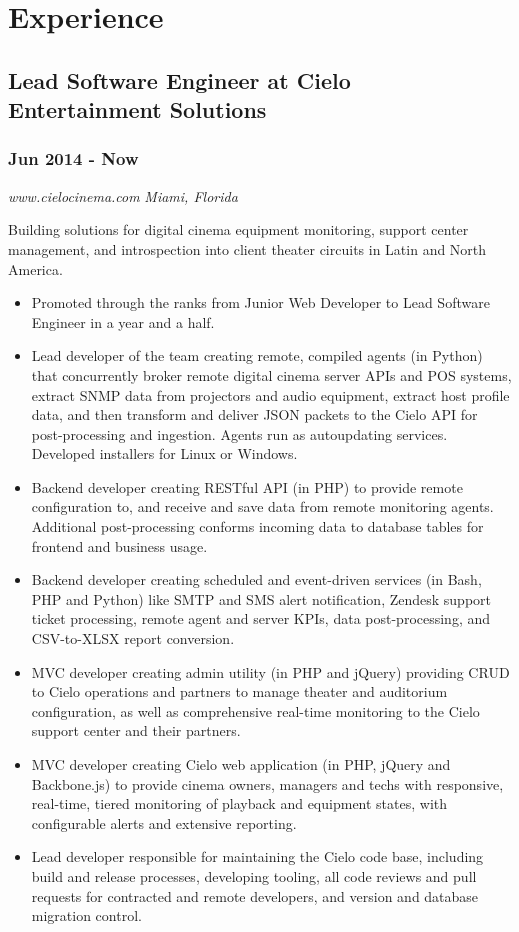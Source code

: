 \documentclass[letterpaper]{article}
\begin{document}
\section{Experience}
\label{sec-3}

\subsection{Lead Software Engineer at Cielo Entertainment Solutions}
\label{sec-3-1}
\subsubsection{Jun 2014 - Now}
\label{sec-3-1-1}
\emph{www.cielocinema.com} \hfill \emph{Miami, Florida}\\
\vspace{0.1in}

Building solutions for digital cinema equipment monitoring, support center management, and introspection into client theater circuits in Latin and North America.\\
\vspace{0.1in}

\begin{itemize}
\item Promoted through the ranks from Junior Web Developer to Lead Software Engineer in a year and a half.
\item Lead developer of the team creating remote, compiled agents (in Python) that concurrently broker remote digital cinema server APIs and POS systems, extract SNMP data from projectors and audio equipment, extract host profile data, and then transform and deliver JSON packets to the Cielo API for post-processing and ingestion. Agents run as autoupdating services. Developed installers for Linux or Windows.
\item Backend developer creating RESTful API (in PHP) to provide remote configuration to, and receive and save data from remote monitoring agents. Additional post-processing conforms incoming data to database tables for frontend and business usage.
\item Backend developer creating scheduled and event-driven services (in Bash, PHP and Python) like SMTP and SMS alert notification, Zendesk support ticket processing, remote agent and server KPIs, data post-processing, and CSV-to-XLSX report conversion.
\item MVC developer creating admin utility (in PHP and jQuery) providing CRUD to Cielo operations and partners to manage theater and auditorium configuration, as well as comprehensive real-time monitoring to the Cielo support center and their partners.
\item MVC developer creating Cielo web application (in PHP, jQuery and Backbone.js) to provide cinema owners, managers and techs with responsive, real-time, tiered monitoring of playback and equipment states, with configurable alerts and extensive reporting.
\item Lead developer responsible for maintaining the Cielo code base, including build and release processes, developing tooling, all code reviews and pull requests for contracted and remote developers, and version and database migration control.
\end{itemize}
\end{document}
